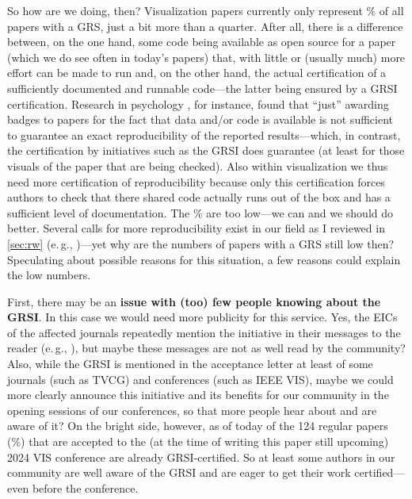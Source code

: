 \documentclass[conference,svgnames]{vgtc}                     %
\newcommand{\eg}{e.\,g.}
\begin{document}
So how are we doing, then? Visualization papers currently only represent \GrsiPercentageVisPapers{}\% of all papers with a GRS, just a bit more than a quarter. After all, there is a difference between, on the one hand, some code being available as open source for a paper (which we do see often in today's papers) that, with little or (usually much) more effort \cite{Bonneel:2020:CRC} can be made to run and, on the other hand, the actual certification of a sufficiently documented and runnable code---the latter being ensured by a GRSI certification. Research in psychology \cite{Crumwell:2023:WBC}, for instance, found that ``just'' awarding badges to papers for the fact that data and/or code is available is not sufficient to guarantee an exact reproducibility of the reported results---which, in contrast, the certification by initiatives such as the GRSI does guarantee (at least for those visuals of the paper that are being checked). Also within visualization we thus need more certification of reproducibility because only this certification forces authors to check that there shared code actually runs out of the box and has a sufficient level of documentation. The \GrsiPercentageVisPapers{}\% are too low---we can and we should do better. Several calls for more reproducibility exist in our field as I reviewed in \autoref{sec:rw} (\eg, \cite{Fekete:2020:ERV,Haroz:2018:OPV,Kosara:2016:EBS})---yet why are the numbers of papers with a GRS still low then? Speculating about possible reasons for this situation, a few reasons could explain the low numbers.

First, there may be an \textbf{issue with (too) few people knowing about the GRSI}. In this case we would need more publicity for this service. Yes, the EICs of the affected journals repeatedly mention the initiative in their messages to the reader (\eg, \cite{DeFloriani:2018:MEC,Jorge:2018:EN}), but maybe these messages are not as well read by the community? Also, while the GRSI is mentioned in the acceptance letter at least of some journals (such as TVCG) and conferences (such as IEEE VIS), maybe we could more clearly announce this initiative and its benefits for our community in the opening sessions of our conferences, so that more people hear about and are aware of it? On the bright side, however, as of today \GrsiIeeeVisPapersInMMXXIV{} of the 124 regular papers (\pgfmathresult\%) that are accepted to the (at the time of writing this paper still upcoming) 2024 VIS conference are already GRSI-certified. So at least some authors in our community are well aware of the GRSI and are eager to get their work certified---even before the conference.
\end{document}

